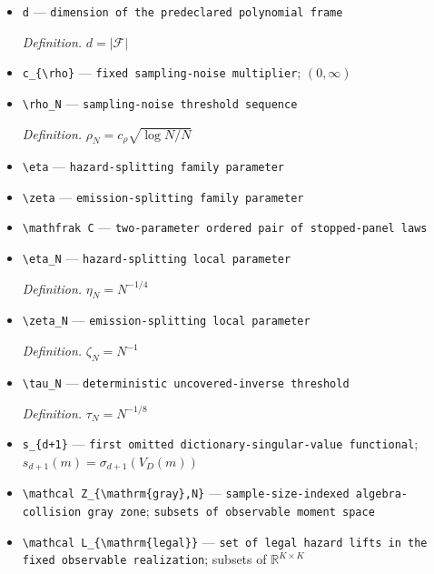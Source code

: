 \documentclass{article}
\begin{document}
\begin{itemize}
  \item \texttt{d} --- \texttt{dimension of the predeclared polynomial frame}
  \par\smallskip\noindent\emph{Definition.} \(d=|\mathcal F|\)
  \item \texttt{c\_\allowbreak{}\{\textbackslash{}\allowbreak{}rho\}\allowbreak{}} --- \texttt{fixed sampling-\allowbreak{}noise multiplier}; \((0,\infty)\)
  \item \texttt{\textbackslash{}\allowbreak{}rho\_\allowbreak{}N} --- \texttt{sampling-\allowbreak{}noise threshold sequence}
  \par\smallskip\noindent\emph{Definition.} \(\rho_N=c_{\rho}\sqrt{\log N/N}\)
  \item \texttt{\textbackslash{}\allowbreak{}eta} --- \texttt{hazard-\allowbreak{}splitting family parameter}
  \item \texttt{\textbackslash{}\allowbreak{}zeta} --- \texttt{emission-\allowbreak{}splitting family parameter}
  \item \texttt{\textbackslash{}\allowbreak{}mathfrak C} --- \texttt{two-\allowbreak{}parameter ordered pair of stopped-\allowbreak{}panel laws}
  \item \texttt{\textbackslash{}\allowbreak{}eta\_\allowbreak{}N} --- \texttt{hazard-\allowbreak{}splitting local parameter}
  \par\smallskip\noindent\emph{Definition.} \(\eta_N=N^{-1/4}\)
  \item \texttt{\textbackslash{}\allowbreak{}zeta\_\allowbreak{}N} --- \texttt{emission-\allowbreak{}splitting local parameter}
  \par\smallskip\noindent\emph{Definition.} \(\zeta_N=N^{-1}\)
  \item \texttt{\textbackslash{}\allowbreak{}tau\_\allowbreak{}N} --- \texttt{deterministic uncovered-\allowbreak{}inverse threshold}
  \par\smallskip\noindent\emph{Definition.} \(\tau_N=N^{-1/8}\)
  \item \texttt{s\_\allowbreak{}\{d+\allowbreak{}1\}\allowbreak{}} --- \texttt{first omitted dictionary-\allowbreak{}singular-\allowbreak{}value functional}; \(s_{d+1}(m)=\sigma_{d+1}(V_D(m))\)
  \item \texttt{\textbackslash{}\allowbreak{}mathcal Z\_\allowbreak{}\{\textbackslash{}\allowbreak{}mathrm\{gray\}\allowbreak{},\allowbreak{}N\}\allowbreak{}} --- \texttt{sample-\allowbreak{}size-\allowbreak{}indexed algebra-\allowbreak{}collision gray zone}; \texttt{subsets of observable moment space}
  \item \texttt{\textbackslash{}\allowbreak{}mathcal L\_\allowbreak{}\{\textbackslash{}\allowbreak{}mathrm\{legal\}\allowbreak{}\}\allowbreak{}} --- \texttt{set of legal hazard lifts in the fixed observable realization}; subsets of \(\mathbb R^{K\times K}\)

\end{itemize}
\end{document}
